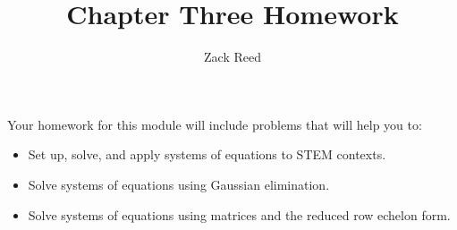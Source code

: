 \documentclass{ximera}
\author{Zack Reed}
\title{Chapter Three Homework}
\begin{document}
 
\begin{abstract}
\end{abstract}
 
\maketitle
 
Your homework for this module will include problems that will help you to:
 
\begin{itemize}
\item Set up, solve, and apply systems of equations to STEM contexts.
\item Solve systems of equations using Gaussian elimination.
\item Solve systems of equations using matrices and the reduced row echelon form.
\end{itemize}
 
 
\end{document}
